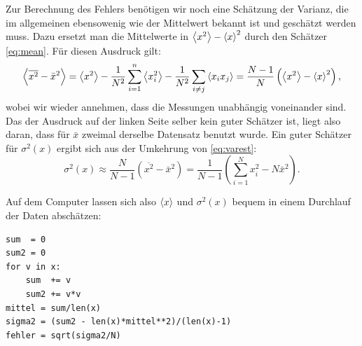Zur Berechnung des Fehlers benötigen wir noch eine Schätzung der
Varianz, die im allgemeinen ebensowenig wie der Mittelwert bekannt ist
und geschätzt werden muss. Dazu ersetzt man die Mittelwerte in
$\left\langle{x^2}\right\rangle - \left\langle{x}\right\rangle^2$ durch den Schätzer \eqref{eq:mean}. Für
diesen Ausdruck gilt:
\begin{equation}
  \label{eq:varest}
  \left\langle{\overline{x^2} - \bar{x}^2}\right\rangle
  = \left\langle{x^2}\right\rangle - 
  \frac{1}{N^2}\sum_{i=1}^n \left\langle{x_i^2}\right\rangle
  - \frac{1}{N^2}\sum_{i\neq j} \left\langle{x_ix_j}\right\rangle
  = \frac{N-1}{N}\left(\left\langle{x^2}\right\rangle - \left\langle{x}\right\rangle^2\right),
\end{equation}
wobei wir wieder annehmen, dass die Messungen unabhängig voneinander
sind. Das der Ausdruck auf der linken Seite selber kein guter
Schätzer ist, liegt also daran, dass für $\bar{x}$ zweimal derselbe
Datensatz benutzt wurde. Ein guter Schätzer für $\sigma^2(x)$ ergibt
sich aus der Umkehrung von \eqref{eq:varest}:
\begin{equation}
  \sigma^2(x) \approx \frac{N}{N-1}\left(\overline{x^2} - \bar{x}^2\right)
  = \frac{1}{N-1} \left(\sum_{i=1}^N x_i^2 - N\bar{x}^2\right).
\end{equation}

Auf dem Computer lassen sich also $\left\langle{x}\right\rangle$ und $\sigma^2(x)$ bequem in
einem Durchlauf der Daten abschätzen:
\begin{lstlisting}
sum  = 0
sum2 = 0
for v in x:
    sum  += v
    sum2 += v*v
mittel = sum/len(x)
sigma2 = (sum2 - len(x)*mittel**2)/(len(x)-1)
fehler = sqrt(sigma2/N)
\end{lstlisting}

